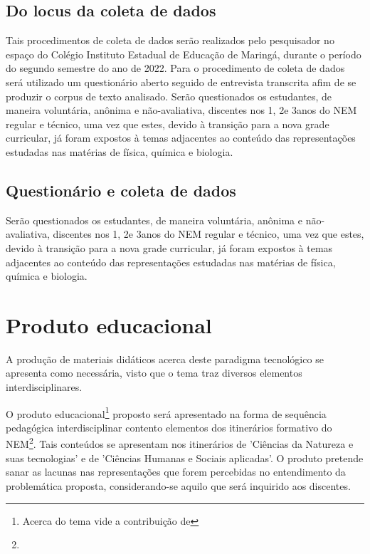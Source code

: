 \documentclass[
  12pt,       %
  openright,      %
  twoside,      %
  a4paper,      %
  english,      %
  french,       %
  spanish,      %
  brazil        %
  ]{abntex2}
\begin{document}
\section{Do locus da coleta de dados}

Tais procedimentos de coleta de dados serão realizados pelo pesquisador no espaço do Colégio Instituto Estadual de Educação de Maringá, durante o período do segundo semestre do ano de 2022. Para o procedimento de coleta de dados será utilizado um questionário aberto seguido de entrevista transcrita afim de se produzir o corpus de texto analisado. Serão questionados os estudantes, de maneira voluntária, anônima e não-avaliativa, discentes nos 1\textordmasculine, 2\textordmasculine e 3\textordmasculine anos do NEM regular e técnico, uma vez que estes, devido à transição para a nova grade curricular, já foram expostos à temas adjacentes ao conteúdo das representações estudadas nas matérias de física, química e biologia. 




\section{Questionário e coleta de dados}

Serão questionados os estudantes, de maneira voluntária, anônima e não-avaliativa, discentes nos 1\textordmasculine, 2\textordmasculine e 3\textordmasculine anos do NEM regular e técnico, uma vez que estes, devido à transição para a nova grade curricular, já foram expostos à temas adjacentes ao conteúdo das representações estudadas nas matérias de física, química e biologia. 



\chapter{Produto educacional}

A produção de materiais didáticos acerca deste paradigma tecnológico se apresenta como necessária, visto que o tema traz diversos elementos interdisciplinares.

O produto educacional\footnote{Acerca do tema vide a contribuição de } proposto será apresentado na forma de sequência pedagógica interdisciplinar contento elementos dos itinerários formativo do NEM\footnote{}. Tais conteúdos se apresentam nos itinerários de 'Ciências da Natureza e suas tecnologias' e de 'Ciências Humanas e Sociais aplicadas'. O produto pretende sanar as lacunas nas representações que forem percebidas no entendimento da problemática proposta, considerando-se aquilo que será inquirido aos discentes.
\end{document}
